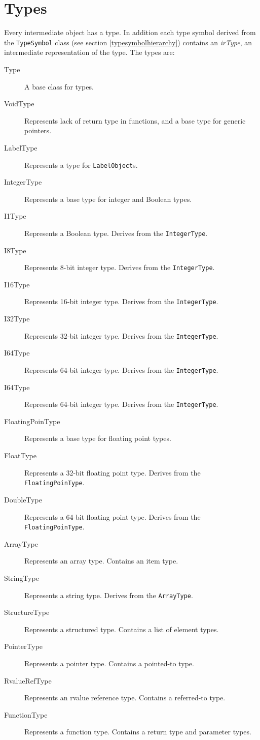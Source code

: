 \documentclass[a4paper,oneside,11pt]{book}
\theoremstyle{definition}
\begin{document}
\section{Types}

Every intermediate object has a type.
In addition each type symbol derived from the \verb|TypeSymbol| class (see section \ref{typesymbolhierarchy}) contains an \emph{irType},
an intermediate representation of the type.
The types are:
\begin{description}
\item[Type]
A base class for types.
\item[VoidType]
Represents lack of return type in functions, and a base type for generic pointers.
\item[LabelType]
Represents a type for \verb|LabelObject|s.
\item[IntegerType]
Represents a base type for integer and Boolean types.
\item[I1Type]
Represents a Boolean type. Derives from the \verb|IntegerType|.
\item[I8Type]
Represents 8-bit integer type. Derives from the \verb|IntegerType|.
\item[I16Type]
Represents 16-bit integer type. Derives from the \verb|IntegerType|.
\item[I32Type]
Represents 32-bit integer type. Derives from the \verb|IntegerType|.
\item[I64Type]
Represents 64-bit integer type. Derives from the \verb|IntegerType|.
\item[I64Type]
Represents 64-bit integer type. Derives from the \verb|IntegerType|.
\item[FloatingPoinType]
Represents a base type for floating point types.
\item[FloatType]
Represents a 32-bit floating point type. Derives from the \verb|FloatingPoinType|.
\item[DoubleType]
Represents a 64-bit floating point type. Derives from the \verb|FloatingPoinType|.
\item[ArrayType]
Represents an array type. Contains an item type.
\item[StringType]
Represents a string type. Derives from the \verb|ArrayType|.
\item[StructureType]
Represents a structured type. Contains a list of element types.
\item[PointerType]
Represents a pointer type. Contains a pointed-to type.
\item[RvalueRefType]
Represents an rvalue reference type. Contains a referred-to type.
\item[FunctionType]
Represents a function type. Contains a return type and parameter types.
\end{description}
\end{document}
